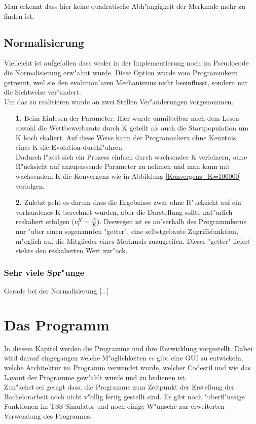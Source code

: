 \documentclass[11pt, a4paper, german]{article}
\theoremstyle{plain}
\begin{document}
	Man erkennt dass hier keine quadratische Abh"angigkeit der Merkmale mehr zu finden ist.
	
	\subsection{Normalisierung}
	Vielleicht ist aufgefallen dass weder in der Implementierung noch im Pseudocode die Normalisierung erw"ahnt wurde. Diese Option wurde vom Programmkern getrennt, weil sie den evolution"aren Mechanismus nicht beeinflusst, sondern nur die Sichtweise ver"andert.\\
	Um das zu realisieren wurde an zwei Stellen Ver"anderungen vorgenommen.
	\begin{itemize}
		\item [\textbf{1.}] Beim Einlesen der Parameter. Hier wurde unmittelbar nach dem Lesen sowohl die Wettbewerbsrate durch K geteilt als auch die Startpopulation um K hoch skaliert. Auf diese Weise kann der Programmkern ohne Kenntnis eines K die Evolution durchf"uhren.\\ 
		Dadurch l"asst sich ein Prozess einfach durch wachsendes K verfeinern, ohne R"ucksicht auf anzupassende Parameter zu nehmen und man kann mit wachsendem K die Konvergenz wie in Abbildung \ref{Konvergenz_K=100000} verfolgen.
		\item [\textbf{2.}] Zuletzt geht es darum dass die Ergebnisse zwar ohne R"ucksicht auf ein vorhandenes K berechnet wurden, aber die Darstellung sollte nat"urlich reskaliert erfolgen ($ \nu_t^K = \frac{\nu_t}{K} $). Deswegen ist es au"serhalb des Programmkerns nur "uber einen sogenannten "{}getter"{}, eine selbstgebaute Zugriffsfunktion, m"oglich auf die Mitglieder eines Merkmals zuzugreifen. Dieser "{}getter"{} liefert stehts den reskalierten Wert zur"uck.\\
	\end{itemize}
	
	\subsubsection{Sehr viele Spr"unge}
	Gerade bei der Normalisierung [...]
	
	
\clearpage	
\section{Das Programm}
In diesem Kapitel werden die Programme und ihre Entwicklung vorgestellt. Dabei wird darauf eingegangen welche M"oglichkeiten es gibt eine GUI zu entwickeln, welche Architektur im Programm verwendet wurde, welcher Codestil und wie das Layout der Programme gew"ahlt wurde und zu bedienen ist.\\
Zun"achst sei gesagt dass, die Programme zum Zeitpunkt der Erstellung der Bachelorarbeit noch nicht v"ollig fertig gestellt sind. Es gibt noch "uberfl"ussige Funktionen im TSS Simulator und noch einige W"unsche zur erweiterten Verwendung des Programms. 
\end{document}
